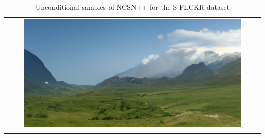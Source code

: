 \begin{longtable}{c}
    \includegraphics[width=0.87\textwidth]{Chapters/figures/appendix/flickr/20_uncond_sample.png} \\
    \caption{Unconditional samples of NCSN++ for the S-FLCKR dataset}
\end{longtable}